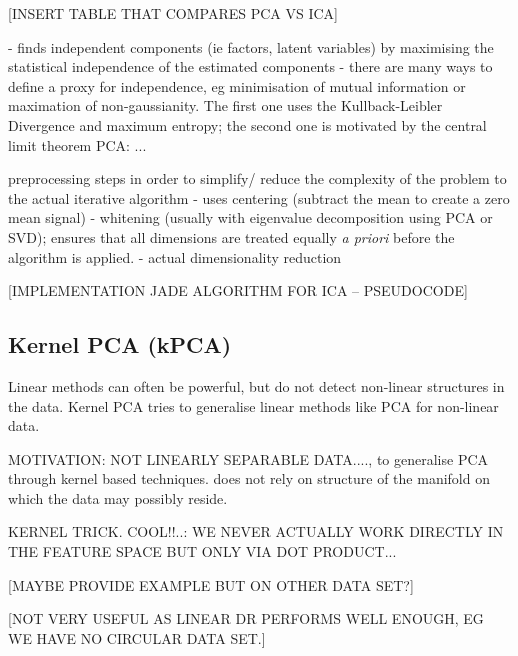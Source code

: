 \documentclass[journal, a4paper]{IEEEtran}
\begin{document}
[INSERT TABLE THAT COMPARES PCA VS ICA] 



- finds independent components (ie factors, latent variables) by maximising the statistical independence of the estimated components
- there are many ways to define a proxy for independence, eg minimisation of mutual information or maximation of non-gaussianity. The first one uses the Kullback-Leibler Divergence and maximum entropy; the second one is motivated by the central limit theorem %
PCA:
...

preprocessing steps in order to simplify/ reduce the complexity of the problem to the actual iterative algorithm
- uses centering (subtract the mean to create a zero mean signal)
- whitening (usually with eigenvalue decomposition using PCA or SVD); ensures that all dimensions are treated equally \textit{a priori} before the algorithm is applied. 
- actual dimensionality reduction 


[IMPLEMENTATION JADE ALGORITHM FOR ICA -- PSEUDOCODE]



\subsection{Kernel PCA (kPCA)}

Linear methods can often be powerful, but do not detect non-linear structures in the data.
Kernel PCA tries to generalise linear methods like PCA for non-linear data.

MOTIVATION: NOT LINEARLY SEPARABLE DATA...., to generalise PCA through kernel based techniques. does not rely on structure of the manifold on which the data may possibly reside. 

KERNEL TRICK. COOL!!..: WE NEVER ACTUALLY WORK DIRECTLY IN THE FEATURE SPACE BUT ONLY VIA DOT PRODUCT...


[MAYBE PROVIDE EXAMPLE BUT ON OTHER DATA SET?]

[NOT VERY USEFUL AS LINEAR DR PERFORMS WELL ENOUGH, EG WE HAVE NO CIRCULAR DATA SET.] 
\end{document}
